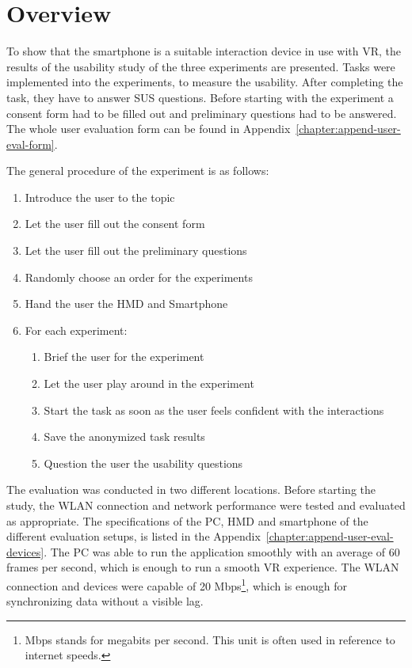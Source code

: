 \section{Overview}\label{section:evaluation-overview}

To show that the smartphone is a suitable interaction device in use with \ac{VR}, the results of the usability study of the three experiments are presented. Tasks were implemented into the experiments, to measure the usability. After completing the task, they have to answer \ac{SUS} questions. Before starting with the experiment a consent form had to be filled out and preliminary questions had to be answered. The whole user evaluation form can be found in Appendix~\ref{chapter:append-user-eval-form}. 

The general procedure of the experiment is as follows:
\begin{enumerate}
  \item Introduce the user to the topic
  \item Let the user fill out the consent form
  \item Let the user fill out the preliminary questions
  \item Randomly choose an order for the experiments
  \item Hand the user the \ac{HMD} and Smartphone
  \item For each experiment:
  \begin{enumerate}
  \item Brief the user for the experiment
  \item Let the user play around in the experiment
  \item Start the task as soon as the user feels confident with the interactions
  \item Save the anonymized task results
  \item Question the user the usability questions
  \end{enumerate}
\end{enumerate}

The evaluation was conducted in two different locations. Before starting the study, the \ac{WLAN} connection and network performance were tested and evaluated as appropriate. The specifications of the \ac{PC}, \ac{HMD} and smartphone of the different evaluation setups, is listed in the Appendix~\ref{chapter:append-user-eval-devices}. The \ac{PC} was able to run the application smoothly with an average of 60 frames per second, which is enough to run a smooth \ac{VR} experience. The \ac{WLAN} connection and devices were capable of 20 Mbps\footnote{Mbps stands for megabits per second. This unit is often used in reference to internet speeds.}, which is enough for synchronizing data without a visible lag.

